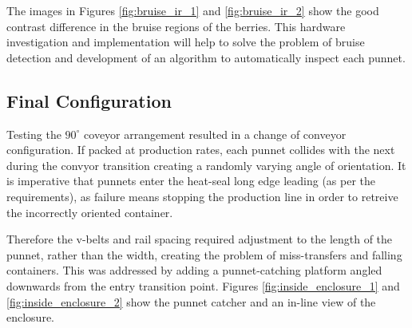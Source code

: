 \documentclass[fleqn,twoside]{article}
\begin{document}
The images in Figures \ref{fig:bruise_ir_1} and \ref{fig:bruise_ir_2} show the good contrast difference in the bruise regions of the berries. This hardware investigation and implementation will help to solve the problem of bruise detection and development of an algorithm to automatically inspect each punnet.

 

\subsection{Final Configuration}


Testing the $90^{\circ}$ coveyor arrangement resulted in a change of conveyor configuration. If packed at production rates, each punnet collides with the next during the convyor transition creating a randomly varying angle of orientation. It is imperative that punnets enter the heat-seal long edge leading (as per the requirements), as failure means stopping the production line in order to retreive the incorrectly oriented container.

Therefore the v-belts and rail spacing required adjustment to the length of the punnet, rather than the width, creating the problem of miss-transfers and falling containers. This was addressed by adding a punnet-catching platform angled downwards from the entry transition point. Figures \ref{fig:inside_enclosure_1} and \ref{fig:inside_enclosure_2} show the punnet catcher and an in-line view of the enclosure.
\end{document}

